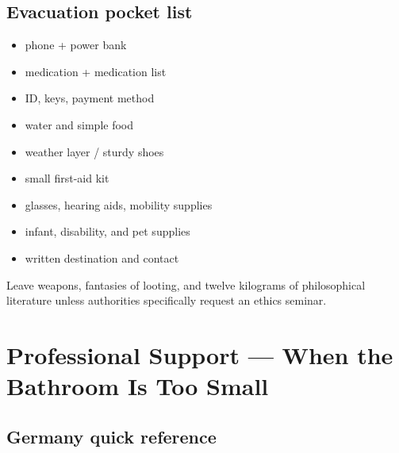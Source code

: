 \hypertarget{evacuation-pocket-list}{%
\subsection{Evacuation pocket list}\label{evacuation-pocket-list}}

\begin{itemize}
\tightlist
\item
  phone + power bank
\item
  medication + medication list
\item
  ID, keys, payment method
\item
  water and simple food
\item
  weather layer / sturdy shoes
\item
  small first-aid kit
\item
  glasses, hearing aids, mobility supplies
\item
  infant, disability, and pet supplies
\item
  written destination and contact
\end{itemize}

Leave weapons, fantasies of looting, and twelve kilograms of
philosophical literature unless authorities specifically request an
ethics seminar.

\hypertarget{07-professional-support}{}
\hypertarget{professional-support-when-the-bathroom-is-too-small}{%
\section{Professional Support --- When the Bathroom Is Too
Small}\label{professional-support-when-the-bathroom-is-too-small}}

\hypertarget{germany-quick-reference}{%
\subsection{Germany quick reference}\label{germany-quick-reference}}

